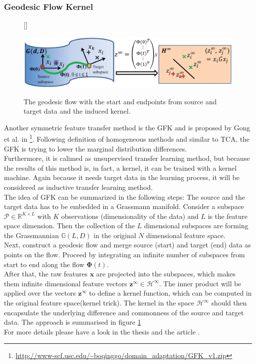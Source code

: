 \subsubsection{Geodesic Flow Kernel}
\begin{figure}[t]
	\centering
	[\FBwidth]
	{\caption[Summary of Geodesic Flow Kernel Approach]{The geodesic flow with the start and endpoints from source and target data and the induced kernel.\cite{Gong.}}}
	{\includegraphics[width=\linewidth]{figures/GFKApproach.png}\label{FigGFKApproach}}
\end{figure}
Another symmetric feature transfer method is the \ac{GFK} and is proposed by Gong et al. in \cite{Gong.}\footnote{\url{http://www-scf.usc.edu/~boqinggo/domain\_adaptation/GFK\_v1.zip}}.
Following definition of homogeneous methods and similar to \acs{TCA}, the \acl{GFK} is trying to lower the marginal distribution differences.\cite[p. 13]{Weiss.2016}\\
Furthermore, it is calimed as unsupervised transfer learning method, but because the results of this method is, in fact, a kernel, it can be trained with a kernel machine.\cite{Gong.}
Again because it needs target data in the learning process, it will be considered as inductive transfer learning method.\\
The idea of \acs{GFK} can be summarized in the following steps:
The source and the target data has to be embedded in a Grassmann manifold.
Consider a subspace $\mathcal{P} \in \mathbb{R}^{K \times L}$ with $K$ observations (dimensionality of the data) and $L$ is the feature space dimension.
Then the collection of the $L$ dimensional subspaces are forming the Grassmannian $\mathbb{G}(L, D)$ in the original $N$ dimensional feature space.\cite{Gong.}\\
Next, construct a geodesic flow and merge source (start) and target (end) data as points on the flow.
Proceed by integrating an infinite number of subspaces from start to end along the flow $\boldsymbol{\Phi}(t)$.\cite{Gong.}\\
After that, the raw features $\mathbf{x}$ are projected into the subspaces, which makes them infinite dimensional feature vectors $\mathbf{z}^\infty \in \mathcal{H}^\infty$.
The inner product will be applied over the vectors $\mathbf{z}^\infty$ to define a kernel function, which can be computed in the original feature space(kernel trick).
The kernel in the space $\mathcal{H}^\infty$ should then encapsulate the underlying difference and commonness of the source and target data.\cite{Gong.} The approach is summarised in figure \ref{FigGFKApproach}\\
For more details please have a look in the thesis \cite[p. 45;110-113]{Gong.2015} and the article \cite{Gong.}.
